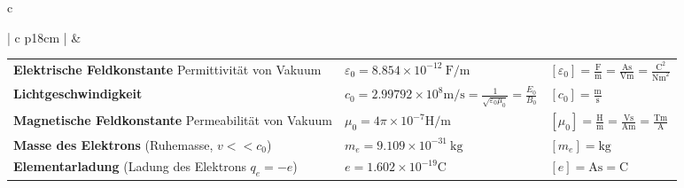 \begin{tabular}{c}
	
	\begin{tabular}{ | c   p{18cm} |}
		\hline
		\rotcell{\large\textbf{\textcolor{white}{Konstanten}}}  &
		\setlength{\extrarowheight}{5pt}			
		\begin{tabular}{L{5cm} L{8cm} L{3.8cm}}
			\textbf{Elektrische Feldkonstante}
			Permittivität von Vakuum &$\varepsilon_{0}=8.854 \times 10^{-12} \mathrm{~F} / \mathrm{m} $&$\left[\varepsilon_{0}\right]=\frac{\mathrm{F}}{\mathrm{m}}=\frac{\mathrm{As}}{\mathrm{Vm}}=\frac{\mathrm{C}^{2}}{\mathrm{Nm}^{2}}$\\[5pt]
			
			
			\textbf{Lichtgeschwindigkeit} &$\displaystyle c_0=2.99792 \times 10^{8} \mathrm{m}/\mathrm{s}=\frac{1}{\sqrt{\varepsilon_{0} \mu_{0}}}=\frac{E_{0}}{B_{0}} $
			&$\left[c_{0}\right]=\frac{\mathrm{m}}{\mathrm{s}}$\\[5pt]
			
			
			\textbf{Magnetische Feldkonstante}
			Permeabilität von Vakuum 
			&$\mu_{0}=4 \pi \times 10^{-7} \mathrm{H} / \mathrm{m} $&$\left[\mu_{0}\right]=\frac{\mathrm{H}}{\mathrm{m}}=\frac{\mathrm{V} \mathrm{s}}{\mathrm{A} \mathrm{m}}=\frac{\mathrm{Tm}}{\mathrm{A}}$\\[10pt]
			
			\textbf{Masse des Elektrons} (Ruhemasse, $v<<c_0$)
			&$m_{e}=9.109 \times 10^{-31} \mathrm{~kg} $&$\left[m_{e}\right]=\mathrm{kg}$\\[5pt]
			
			
			\textbf{Elementarladung}
			(Ladung des Elektrons $q_e = -e$)
			&$e=1.602 \times 10^{-19} \mathrm{C} $&$[e]=\mathrm{As}=\mathrm{C}$\\[5pt]
			

\end{tabular}
\end{tabular}
\end{tabular}
